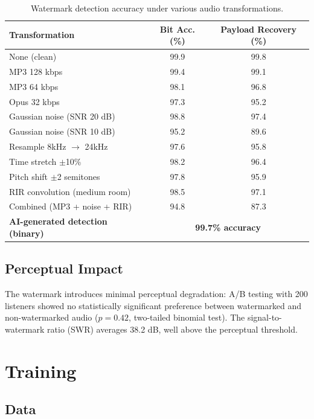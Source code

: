 \documentclass[11pt,a4paper]{article}
\begin{document}
\begin{table}[t]
\centering
\caption{Watermark detection accuracy under various audio transformations.}
\label{tab:watermark}
\begin{tabular}{lcc}
\toprule
\textbf{Transformation} & \textbf{Bit Acc. (\%)} & \textbf{Payload Recovery (\%)} \\
\midrule
None (clean) & 99.9 & 99.8 \\
MP3 128 kbps & 99.4 & 99.1 \\
MP3 64 kbps & 98.1 & 96.8 \\
Opus 32 kbps & 97.3 & 95.2 \\
Gaussian noise (SNR 20 dB) & 98.8 & 97.4 \\
Gaussian noise (SNR 10 dB) & 95.2 & 89.6 \\
Resample 8kHz $\rightarrow$ 24kHz & 97.6 & 95.8 \\
Time stretch $\pm$10\% & 98.2 & 96.4 \\
Pitch shift $\pm$2 semitones & 97.8 & 95.9 \\
RIR convolution (medium room) & 98.5 & 97.1 \\
Combined (MP3 + noise + RIR) & 94.8 & 87.3 \\
\midrule
\textbf{AI-generated detection (binary)} & \multicolumn{2}{c}{\textbf{99.7\% accuracy}} \\
\bottomrule
\end{tabular}
\end{table}

\subsection{Perceptual Impact}

The watermark introduces minimal perceptual degradation: A/B testing with 200 listeners showed no statistically significant preference between watermarked and non-watermarked audio ($p = 0.42$, two-tailed binomial test). The signal-to-watermark ratio (SWR) averages 38.2 dB, well above the perceptual threshold.

\section{Training}
\label{sec:training}

\subsection{Data}
\end{document}
